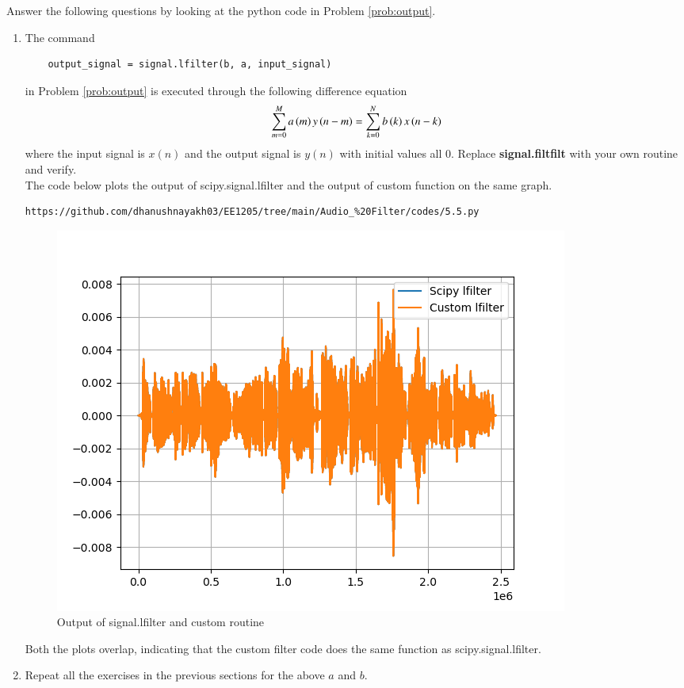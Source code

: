 \documentclass[journal,12pt,twocolumn]{IEEEtran}
\theoremstyle{remark}
\renewcommand\thesection{\arabic{section}}
\numberwithin{equation}{subsection}
\begin{document}
Answer the following questions by looking at the python code in Problem \ref{prob:output}.
\begin{enumerate}[label=\thesection.\arabic*]
\item
The command
\begin{lstlisting}
	output_signal = signal.lfilter(b, a, input_signal)
	\end{lstlisting}
in Problem \ref{prob:output} is executed through the following difference equation
\begin{equation}
\label{eq:iir_filter_gen}
 \sum _{m=0}^{M}a\left(m\right)y\left(n-m\right)=\sum _{k=0}^{N}b\left(k\right)x\left(n-k\right)
\end{equation}
%
where the input signal is $x(n)$ and the output signal is $y(n)$ with initial values all 0. Replace
\textbf{signal.filtfilt} with your own routine and verify.
\\

\solution The code below plots the output of scipy.signal.lfilter and the output of custom function on the same graph.
\begin{lstlisting}
https://github.com/dhanushnayakh03/EE1205/tree/main/Audio_%20Filter/codes/5.5.py
\end{lstlisting}
\newpage
\begin{figure}[!h]
    \centering
    \includegraphics[width = \columnwidth]{figs/lfilter.png}
    \caption{Output of signal.lfilter and custom routine}
    \label{fig:7.1}
\end{figure}
Both the plots overlap, indicating that the custom filter code does the same function as scipy.signal.lfilter.
\item Repeat all the exercises in the previous sections for the above $a$ and $b$.\\


\end{enumerate}
\end{document}

